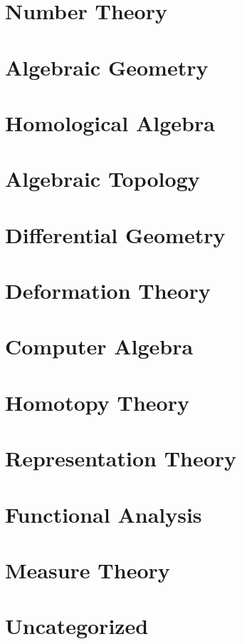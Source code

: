 \documentclass{report}
\begin{document}
\chapter{Number Theory}
\renewcommand{\cat}{NT}




\chapter{Algebraic Geometry}
\renewcommand{\cat}{AG}






\chapter{Homological Algebra}
\renewcommand{\cat}{HA}




\chapter{Algebraic Topology}
\renewcommand{\cat}{AT}


\chapter{Differential Geometry}
\renewcommand{\cat}{DG}




\chapter{Deformation Theory}
\renewcommand{\cat}{DT}


\chapter{Computer Algebra}
\renewcommand{\cat}{CP}


\chapter{Homotopy Theory}
\renewcommand{\cat}{HT}



\chapter{Representation Theory}
\renewcommand{\cat}{RT}


\chapter{Functional Analysis}
\renewcommand{\cat}{FA}


\chapter{Measure Theory}
\renewcommand{\cat}{MT}


\chapter{Uncategorized}
\renewcommand{\cat}{UN}


\end{document}
